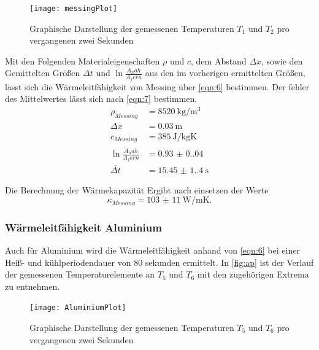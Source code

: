 \begin{figure}[H]
  \centering
  \caption{Graphische Darstellung der gemessenen Temperaturen $T_1$ und $T_2$ pro vergangenen zwei Sekunden}
  \label{fig:mp}
  \texttt{[image: messingPlot]}
\end{figure}

\noindent Mit den Folgenden Materialeigenschaften $\rho$ und $c$, dem Abstand $\Delta x$, sowie den
Gemittelten Größen $\Delta t $ und $ \ln{\frac{A_nah}{A_fern}}$ aus den im vorherigen ermittelten Größen,
lässt sich die Wärmeleitfähigkeit von Messing über \autoref{eqn:6} bestimmen. Der fehler des Mittelwertes
lässt sich nach \autoref{eqn:7} bestimmen.
\begin{align*}
  \rho_{Messing}                                &= \qty{8520}{\kilo\gram\per\cubic\meter}\\
  \Delta x                              &= \qty{0.03}{\meter}\\
  c_{Messing}                                   &= \qty{385}{\joule\per\kilo\gram\kelvin}\\
  \overline{\ln{\frac{A_nah}{A_fern}}}  &= \qty{0.93(0.04)}{}\\
  \overline{\Delta t}                   &= \qty{15.45(1.4)}{\second}
\end{align*}

\noindent Die Berechnung der Wärmekapazität Ergibt nach einsetzen der Werte
\begin{equation}
  \kappa_{Messing} = \qty{103(11)}{\watt\per\meter\kelvin}.
\end{equation}

\subsubsection{Wärmeleitfähigkeit Aluminium}
Auch für Aluminium wird die Wärmeleitfähigkeit anhand von \autoref{eqn:6} bei einer Heiß- und 
kühlperiodendauer von 80 sekunden ermittelt. In \autoref{fig:ap} ist der Verlauf der gemessenen 
Temperaturelemente an $T_5$ und $T_6$ mit den zugehörigen Extrema zu entnehmen.
\begin{figure}[H]
  \centering
  \caption{Graphische Darstellung der gemessenen Temperaturen $T_5$ und $T_6$ pro vergangenen zwei Sekunden}
  \label{fig:ap}
  \texttt{[image: AluminiumPlot]}
\end{figure}

